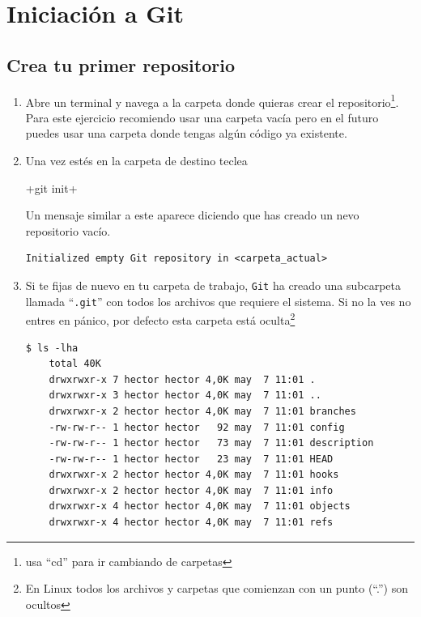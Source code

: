 \documentclass[a5paper,10pt]{article}
\begin{document}
  \section{Iniciación a Git}
    \subsection{Crea tu primer repositorio}\label{sec:new_repo}
    \begin{enumerate}
      \item Abre un terminal y navega a la carpeta donde quieras crear el repositorio\footnote{usa ``cd'' para ir cambiando de carpetas}. Para este ejercicio recomiendo usar una carpeta vacía pero en el futuro puedes usar una carpeta donde tengas algún código ya existente. 
      
      \item Una vez estés en la carpeta de destino teclea
      
      \cverb+git init+
    
      Un mensaje similar a este aparece diciendo que has creado un nevo repositorio vacío.
      
      \begin{lstlisting}[style=custom]
  Initialized empty Git repository in <carpeta_actual>
      \end{lstlisting}
      
      \item Si te fijas de nuevo en tu carpeta de trabajo, \verb+Git+ ha creado una subcarpeta llamada ``\verb+.git+'' con todos los archivos que requiere el sistema. Si no la ves no entres en pánico, por defecto esta carpeta está oculta\footnote{En Linux todos los archivos y carpetas que comienzan con un punto (``.'') son ocultos}
    
      \begin{lstlisting}[style=custom]
  $ ls -lha
    total 40K
    drwxrwxr-x 7 hector hector 4,0K may  7 11:01 .
    drwxrwxr-x 3 hector hector 4,0K may  7 11:01 ..
    drwxrwxr-x 2 hector hector 4,0K may  7 11:01 branches
    -rw-rw-r-- 1 hector hector   92 may  7 11:01 config
    -rw-rw-r-- 1 hector hector   73 may  7 11:01 description
    -rw-rw-r-- 1 hector hector   23 may  7 11:01 HEAD
    drwxrwxr-x 2 hector hector 4,0K may  7 11:01 hooks
    drwxrwxr-x 2 hector hector 4,0K may  7 11:01 info
    drwxrwxr-x 4 hector hector 4,0K may  7 11:01 objects
    drwxrwxr-x 4 hector hector 4,0K may  7 11:01 refs
      \end{lstlisting}
    

\end{enumerate}
\end{document}
